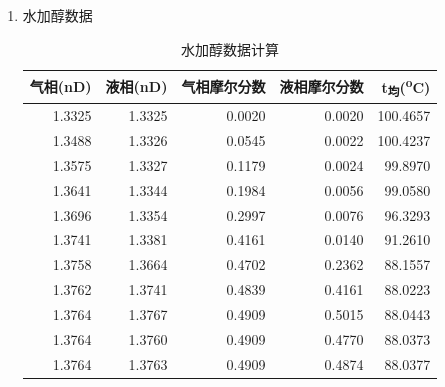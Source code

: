 \documentclass[11pt]{report}
\begin{document}
\begin{enumerate}
\item 水加醇数据
\label{sec:org4322930}
\begin{table}[htbp]
\caption{\label{tab:org3172747}水加醇数据计算}
\centering
\begin{tabular}{rrrrr}
气相(nD) & 液相(nD) & 气相摩尔分数 & 液相摩尔分数 & t\textsubscript{均}(\textsuperscript{o}C)\\
\hline
1.3325 & 1.3325 & 0.0020 & 0.0020 & 100.4657\\
1.3488 & 1.3326 & 0.0545 & 0.0022 & 100.4237\\
1.3575 & 1.3327 & 0.1179 & 0.0024 & 99.8970\\
1.3641 & 1.3344 & 0.1984 & 0.0056 & 99.0580\\
1.3696 & 1.3354 & 0.2997 & 0.0076 & 96.3293\\
1.3741 & 1.3381 & 0.4161 & 0.0140 & 91.2610\\
1.3758 & 1.3664 & 0.4702 & 0.2362 & 88.1557\\
1.3762 & 1.3741 & 0.4839 & 0.4161 & 88.0223\\
1.3764 & 1.3767 & 0.4909 & 0.5015 & 88.0443\\
1.3764 & 1.3760 & 0.4909 & 0.4770 & 88.0373\\
1.3764 & 1.3763 & 0.4909 & 0.4874 & 88.0377\\
\end{tabular}
\end{table}
\end{enumerate}
\end{document}
